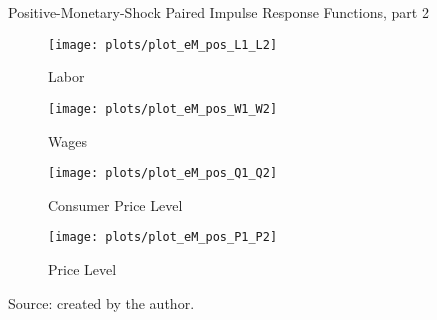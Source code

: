 \documentclass[../thesis.tex]{subfiles}
\begin{document}
\begin{figure}[h!]
	\centering
	\caption*{Positive-Monetary-Shock Paired Impulse Response Functions, part 2}
	\begin{subfigure}[b]{0.48\textwidth}
		\centering
		\texttt{[image: plots/plot\_eM\_pos\_L1\_L2]}
		\caption{\scriptsize Labor}
		\label{fig:plot_eM_pos_L1_L2}
	\end{subfigure}
	\hspace*{0.3cm}
	\begin{subfigure}[b]{0.48\textwidth}
		\centering
		\texttt{[image: plots/plot\_eM\_pos\_W1\_W2]}
		\caption{\scriptsize Wages}
		\label{fig:plot_eM_pos_W1_W2}
	\end{subfigure}
	\vspace*{0.1cm}
	\begin{subfigure}[b]{0.48\textwidth}
		\centering
		\texttt{[image: plots/plot\_eM\_pos\_Q1\_Q2]}
		\caption{\scriptsize Consumer Price Level}
		\label{fig:plot_eM_pos_Q1_Q2}
	\end{subfigure}
	\hspace*{0.3cm}
	\begin{subfigure}[b]{0.48\textwidth}
		\centering
		\texttt{[image: plots/plot\_eM\_pos\_P1\_P2]}
		\caption{\scriptsize Price Level}
		\label{fig:plot_eM_pos_P1_P2}
	\end{subfigure}
	\caption*{Source: created by the author.}
	\label{fig:paired_pos_irf2}
\end{figure}
\end{document}
